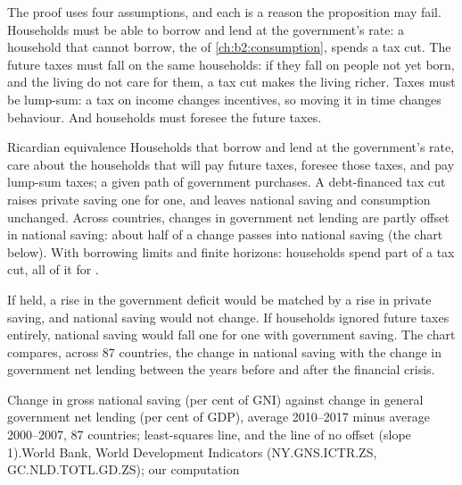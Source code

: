 The proof uses four assumptions, and each is a reason the proposition may fail. Households must be able to borrow and lend
at the government's rate: a household that cannot borrow, the  of \cref{ch:b2:consumption}, spends a tax cut. The
future taxes must fall on the same households: if they fall on people not yet born, and the living do not care for them,
a tax cut makes the living richer. Taxes must be lump-sum: a tax on income changes incentives, so moving it in time changes
behaviour. And households must foresee the future taxes.

\begin{model}{Ricardian equivalence}
\assumes Households that borrow and lend at the government's rate, care about the households that will pay future taxes,
foresee those taxes, and pay lump-sum taxes; a given path of government purchases.
\predicts A debt-financed tax cut raises private saving one for one, and leaves national saving and consumption unchanged.
\tested Across countries, changes in government net lending are partly offset in national saving: about half of a change
passes into national saving (the chart below).
\breaks With borrowing limits and finite horizons: households spend part of a tax cut, all of it for .
\end{model}

If  held, a rise in the government deficit would be matched by a rise in private saving, and national
saving would not change. If households ignored future taxes entirely, national saving would fall one for one with
government saving. The chart compares, across 87 countries, the change in national saving with the change in government net
lending between the years before and after the financial crisis.

\begin{omchart}{Change in gross national saving (per cent of GNI) against change in general government net lending (per
  cent of GDP), average 2010--2017 minus average 2000--2007, 87 countries; least-squares line, and the line of no offset
  (slope 1).}{World Bank, World Development Indicators (NY.GNS.ICTR.ZS, GC.NLD.TOTL.GD.ZS); our computation}
\end{omchart}

